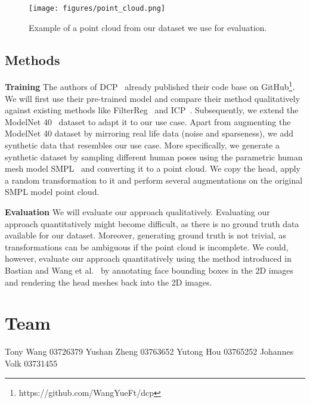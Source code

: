 \documentclass[a4paper,pagesize 10pt]{scrartcl}
\begin{document}
\begin{figure}[!ht]
    \centering
    \texttt{[image: figures/point\_cloud.png]}
    \caption{Example of a point cloud from our dataset we use for evaluation.}
    \label{fig:example_pcd}
\end{figure}

\subsection{Methods}

\textbf{Training} The authors of DCP~\cite{dcp} already published their code base on GitHub\footnote{https://github.com/WangYueFt/dcp}.
We will first use their pre-trained model and compare their method qualitatively against existing methods like FilterReg~\cite{filterreg} and ICP~\cite{icp}.
Subsequently, we extend the ModelNet 40~\cite{modelnet40} dataset to adapt it to our use case.
Apart from augmenting the ModelNet 40 dataset by mirroring real life data (noise and sparseness), we add synthetic data that resembles our use case.
More specifically, we generate a synthetic dataset by sampling different human poses using the parametric human mesh model SMPL~\cite{SMPL:2015} and converting it to a point cloud. 
We copy the head, apply a random transformation to it and perform several augmentations on the original SMPL model point cloud.

\noindent\textbf{Evaluation}
We will evaluate our approach qualitatively.
Evaluating our approach quantitatively might become difficult, as there is no ground truth data available for our dataset.
Moreover, generating ground truth is not trivial, as transformations can be ambiguous if the point cloud is incomplete.
We could, however, evaluate our approach quantitatively using the method introduced in Bastian and Wang et al.~\cite{disguisor} by annotating face bounding boxes in the 2D images and rendering the head meshes back into the 2D images.


\section{Team}
Tony Wang 03726379
\newline
Yushan Zheng 03763652
\newline
Yutong Hou 03765252
\newline
Johannes Volk 03731455

{\small
	
	
}
\end{document}
